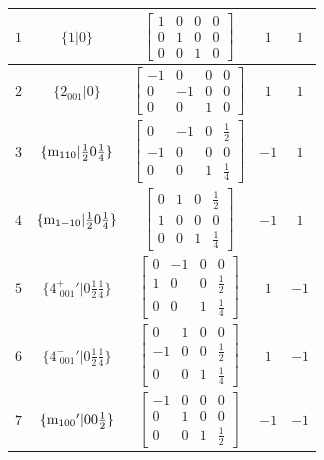 \documentclass[fleqn,8pt]{jsarticle}
\begin{document}
\begin{longtable}{ccccc}
$ 1 $ & $ \{1|0\} $ & $ \begin{bmatrix} 1 & 0 & 0 & 0 \\ 0 & 1 & 0 & 0 \\ 0 & 0 & 1 & 0 \end{bmatrix} $ & $ 1 $ & $ 1 $ \\ \hline
$ 2 $ & $ \{2{}_{001}|0\} $ & $ \begin{bmatrix} -1 & 0 & 0 & 0 \\ 0 & -1 & 0 & 0 \\ 0 & 0 & 1 & 0 \end{bmatrix} $ & $ 1 $ & $ 1 $ \\ \hline
$ 3 $ & $ \{{\rm m}_{110}|\frac{1}{2} 0 \frac{1}{4}\} $ & $ \begin{bmatrix} 0 & -1 & 0 & \frac{1}{2} \\ -1 & 0 & 0 & 0 \\ 0 & 0 & 1 & \frac{1}{4} \end{bmatrix} $ & $ -1 $ & $ 1 $ \\ \hline
$ 4 $ & $ \{{\rm m}_{1-10}|\frac{1}{2} 0 \frac{1}{4}\} $ & $ \begin{bmatrix} 0 & 1 & 0 & \frac{1}{2} \\ 1 & 0 & 0 & 0 \\ 0 & 0 & 1 & \frac{1}{4} \end{bmatrix} $ & $ -1 $ & $ 1 $ \\ \hline
$ 5 $ & $ \{4^{+}_{\,\,001}{}'|0 \frac{1}{2} \frac{1}{4}\} $ & $ \begin{bmatrix} 0 & -1 & 0 & 0 \\ 1 & 0 & 0 & \frac{1}{2} \\ 0 & 0 & 1 & \frac{1}{4} \end{bmatrix} $ & $ 1 $ & $ -1 $ \\ \hline
$ 6 $ & $ \{4^{-}_{\,\,001}{}'|0 \frac{1}{2} \frac{1}{4}\} $ & $ \begin{bmatrix} 0 & 1 & 0 & 0 \\ -1 & 0 & 0 & \frac{1}{2} \\ 0 & 0 & 1 & \frac{1}{4} \end{bmatrix} $ & $ 1 $ & $ -1 $ \\ \hline
$ 7 $ & $ \{{\rm m}_{100}{}'|0 0 \frac{1}{2}\} $ & $ \begin{bmatrix} -1 & 0 & 0 & 0 \\ 0 & 1 & 0 & 0 \\ 0 & 0 & 1 & \frac{1}{2} \end{bmatrix} $ & $ -1 $ & $ -1 $ \\ \hline

\end{longtable}
\end{document}
